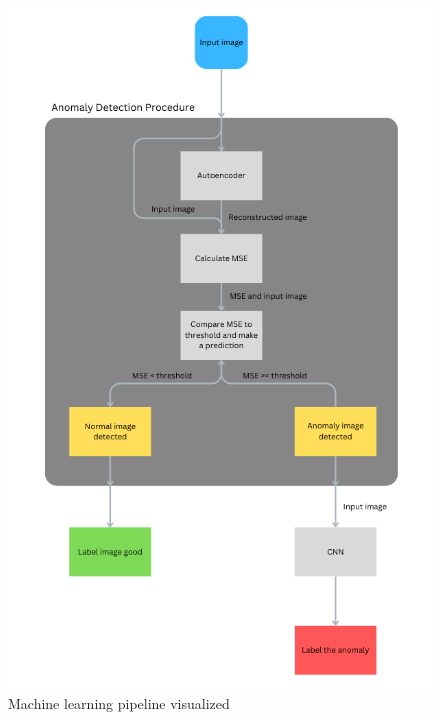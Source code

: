 \begin{figure}[H]
    \centering
    \includegraphics[scale=0.6]{src/images/machine_learning_pipeline.png}
    \caption{Machine learning pipeline visualized}
    \label{fig:ml_pipeline}
\end{figure}